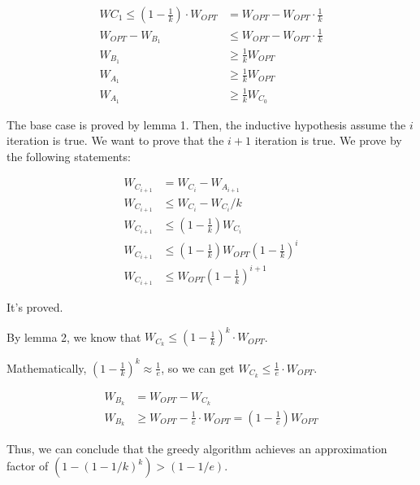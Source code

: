 $$
\begin{aligned}
W{C_1} \le (1-\frac{1}{k})\cdot W_{OPT} &= W_{OPT}-W_{OPT} \cdot \frac{1}{k} \\
W_{OPT} - W_{B_1} &\le W_{OPT}-W_{OPT} \cdot \frac{1}{k} \\
W_{B_1} &\ge \frac{1}{k} W_{OPT} \\
W_{A_1} &\ge \frac{1}{k} W_{OPT} \\
W_{A_1} &\ge \frac{1}{k} W_{C_0} 
\end{aligned}
$$

The base case is proved by lemma 1. Then, the inductive hypothesis assume the $i$ iteration is true. We want to prove that the $i+1$ iteration is true. We prove by the following statements:

$$
\begin{aligned}
W_{C_{i+1}}&=W_{C_{i}}-W_{A_{i+1}} \\ 
W_{C_{i+1}}&\le W_{C_{i}}- W_{C_i}/k \\
W_{C_{i+1}}&\le (1-\frac{1}{k}) W_{C_{i}} \\
W_{C_{i+1}}&\le (1-\frac{1}{k}) W_{OPT} (1-\frac{1}{k})^i \\
W_{C_{i+1}}&\le W_{OPT} (1-\frac{1}{k})^{i+1}
\end{aligned}
$$

It's proved.

By lemma 2, we know that $W_{C_k} \le (1-\frac{1}{k})^k \cdot W_{OPT}$. 

Mathematically, $(1-\frac{1}{k})^k \approx \frac{1}{e}$, so we can get $W_{C_k} \le \frac{1}{e} \cdot W_{OPT}$.

$$
\begin{aligned}
W_{B_k} &= W_{OPT} - W_{C_k}\\
W_{B_k} &\ge W_{OPT} - \frac{1}{e} \cdot W_{OPT} = (1-\frac{1}{e}) W_{OPT}
\end{aligned}
$$

Thus, we can conclude that the greedy algorithm achieves an approximation factor of $\left(1-(1-1 / k)^{k}\right)>(1-1 / e)$. 








